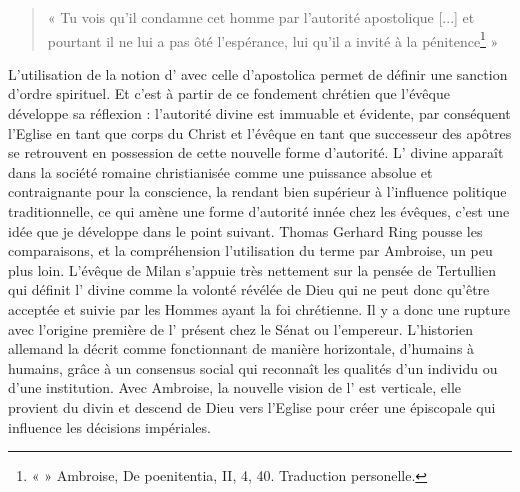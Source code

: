 \bigskip

\begin{quote}
    « Tu vois qu’il condamne cet homme par l’autorité apostolique [...] et pourtant il ne lui a pas ôté l’espérance, lui qu'il a invité à la pénitence\footnote{«  » Ambroise, De poenitentia, II, 4, 40. Traduction personelle.} »
\end{quote}

\bigskip

L’utilisation de la notion d’ avec celle d’apostolica permet de définir une sanction d’ordre spirituel. Et c’est à partir de ce fondement chrétien que l’évêque développe sa réflexion : l’autorité divine est immuable et évidente, par conséquent l’Eglise en tant que corps du Christ et l’évêque en tant que successeur des apôtres se retrouvent en possession de cette nouvelle forme d’autorité. L’ divine apparaît dans la société romaine christianisée comme une puissance absolue et contraignante pour la conscience, la rendant bien supérieur à l'influence politique traditionnelle, ce qui amène une forme d’autorité innée chez les évêques, c’est une idée que je développe dans le point suivant. Thomas Gerhard Ring pousse les comparaisons, et la compréhension l'utilisation du terme par Ambroise, un peu plus loin. L’évêque de Milan s’appuie très nettement sur la pensée de Tertullien qui définit l’ divine comme la volonté révélée de Dieu qui ne peut donc qu’être acceptée et suivie par les Hommes ayant la foi chrétienne. Il y a donc une rupture avec l’origine première de l’ présent chez le Sénat ou l’empereur. L’historien allemand la décrit comme fonctionnant de manière horizontale, d’humains à humains, grâce à un consensus social qui reconnaît les qualités d’un individu ou d’une institution. Avec Ambroise, la nouvelle vision de l’ est verticale, elle provient du divin et descend de Dieu vers l’Eglise pour créer une  épiscopale qui influence les décisions impériales\autocite[À partir de la page 163]{ring_auctoritas}.

\bigskip

